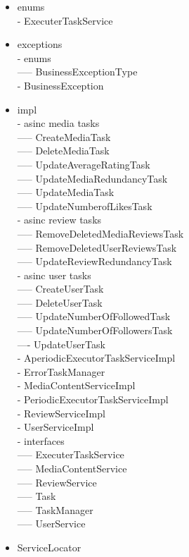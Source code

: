 \begin{itemize}
    \item enums \\
    - ExecuterTaskService
    \item exceptions \\
    - enums \\
    ----- BusinessExceptionType \\
    - BusinessException
    \item impl \\
    - asinc media tasks\\
    ----- CreateMediaTask\\
    ----- DeleteMediaTask\\
    ----- UpdateAverageRatingTask\\
    ----- UpdateMediaRedundancyTask\\
    ----- UpdateMediaTask\\
    ----- UpdateNumberofLikesTask\\
    - asinc review tasks\\
    ----- RemoveDeletedMediaReviewsTask\\
    ----- RemoveDeletedUserReviewsTask\\
    ----- UpdateReviewRedundancyTask\\
    - asinc user tasks\\
    ----- CreateUserTask\\
    ----- DeleteUserTask\\
    ----- UpdateNumberOfFollowedTask\\
    ----- UpdateNumberOfFollowersTask\\
    ---- UpdateUserTask\\
    - AperiodicExecutorTaskServiceImpl\\
    - ErrorTaskManager\\
    - MediaContentServiceImpl\\
    - PeriodicExecutorTaskServiceImpl\\
    - ReviewServiceImpl\\
    - UserServiceImpl\\
    - interfaces \\
    ----- ExecuterTaskService\\
    ----- MediaContentService\\
    ----- ReviewService\\
    ----- Task\\
    ----- TaskManager\\
    ----- UserService
    \item ServiceLocator
\end{itemize}

